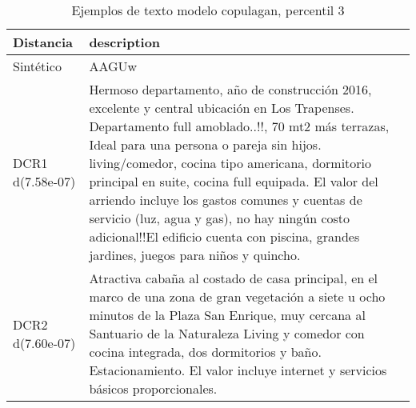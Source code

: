 \begin{table}[H]
\centering
\fontsize{10}{14}\selectfont
\caption{Ejemplos de texto modelo copulagan, percentil 3}
\label{table-example-economicos-a-1-copulagan-3p-text}
\begin{tabular}{|l|m{35em}|}
\hline
\rowcolor[gray]{0.8}
Distancia & description \\
\hline Sintético & AAGUw \\
\hline DCR1 d(7.58e-07) & Hermoso departamento, a\~no de construcci\'on 2016, excelente y central ubicaci\'on en Los Trapenses. Departamento full amoblado..!!, 70 mt2 m\'as terrazas, Ideal para una persona o pareja sin hijos. living/comedor, cocina tipo americana, dormitorio principal en suite, cocina full equipada. El valor del arriendo incluye los gastos comunes y cuentas de servicio (luz, agua y gas), no hay ning\'un costo adicional!!El edificio cuenta con piscina, grandes jardines, juegos para ni\~nos y quincho. \\
\hline DCR2 d(7.60e-07) & Atractiva caba\~na al costado de casa principal, en el marco de una zona de gran vegetaci\'on a siete u ocho minutos de la Plaza San Enrique, muy cercana al Santuario de la Naturaleza
Living y comedor con cocina integrada, dos dormitorios y ba\~no. Estacionamiento.
El valor incluye internet y servicios b\'asicos proporcionales. \\
\hline
\end{tabular}
\end{table}
